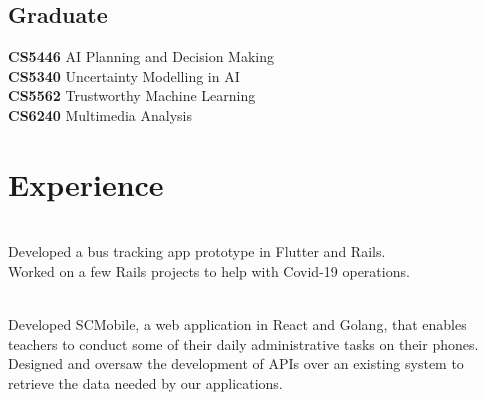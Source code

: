 \documentclass[]{deedy-resume-openfont}
\begin{document}
\begin{minipage}[t]{0.25\textwidth}
\subsection{Graduate}
\textbf{CS5446} AI Planning and Decision Making \\
\textbf{CS5340} Uncertainty Modelling in AI \\
\textbf{CS5562} Trustworthy Machine Learning \\
\textbf{CS6240} Multimedia Analysis \\

%
%


\end{minipage}
\hfill
\begin{minipage}[t]{0.66\textwidth}



\section{Experience}

\\
Developed a bus tracking app prototype in Flutter and Rails.\\
Worked on a few Rails projects to help with Covid-19 operations.

\sectionsep
{}\\
Developed SCMobile, a web application in React and Golang, that enables teachers to conduct some of their daily administrative tasks on their phones. \\
Designed and oversaw the development of APIs over an existing system to retrieve the data needed by our applications.

\sectionsep




\end{minipage}
\end{document}

